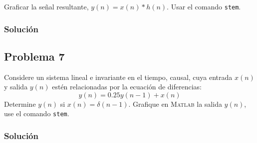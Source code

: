 \documentclass[a4paper,12pt,final]{article}
\begin{document}
    Graficar la señal resultante, $y\left(n\right) = x\left(n\right) * h\left(n\right)$.
    Usar el comando \texttt{stem}.

    \subsubsection*{Solución}

  \newpage
  \subsection*{Problema 7}
    \noindent Considere un sistema lineal e invariante en el tiempo, causal,
    cuya entrada $x\left(n\right)$ y salida $y\left(n\right)$ estén
    relacionadas por la ecuación de diferencias:
    $$y\left(n\right) = 0.25 y\left(n-1\right) + x\left(n\right)$$
    Determine $y\left(n\right)$ si $x\left(n\right) = \delta\left(n-1\right)$.
    Grafique en \textsc{Matlab} la salida $y\left(n\right)$, use el comando \texttt{stem}.

    \subsubsection*{Solución}
\end{document}
